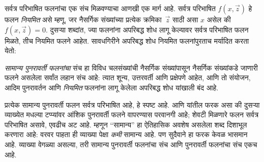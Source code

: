 \documentclass[../../../include/open-logic-section]{subfiles}
\begin{document}

सर्वत्र परिभाषित फलनांचा एक संच मिळवण्याचा आणखी एक मार्ग आहे.
सर्वत्र परिभाषित $f(x,\vec z)$ हे फलन \emph{नियमित} असे म्हणू, जर
नैसर्गिक संख्यांच्या प्रत्येक क्रमिका~$\vec z$ साठी असा $x$ असेल की
$f(x,\vec z) = 0$. दुसऱ्या शब्दांत, ज्या फलनांना अपरिबद्ध शोध लागू
केल्यावर सर्वत्र परिभाषित फलन मिळते, तीच नियमित फलने आहेत.
सावधगिरीने अपरिबद्ध शोध नियमित फलनांपुरताच मर्यादित करता येतो:

\begin{defn}
\emph{सामान्य पुनरावर्ती फलनांचा} संच हा विविध चलसंख्यांची नैसर्गिक
संख्यांपासून नैसर्गिक संख्यांकडे जाणारी फलने असलेला सर्वांत लहान संच
आहे: त्यात शून्य, उत्तरवर्ती आणि प्रक्षेपणे आहेत, आणि तो संयोजन, आदिम
पुनरावर्तन आणि \emph{नियमित} फलनांना लागू केलेला अपरिबद्ध शोध यांखाली
बंद आहे.
\end{defn}

प्रत्येक सामान्य पुनरावर्ती फलन सर्वत्र परिभाषित आहे, हे स्पष्ट आहे.
 आणि 
यांतील फरक असा की दुसऱ्या व्याख्येत मधल्या टप्प्यांवर आंशिक पुनरावर्ती
फलने वापरण्यास परवानगी आहे; शेवटी मिळणारे फलन सर्वत्र परिभाषित असावे,
एवढीच अट आहे. म्हणून ``सामान्य'' हा ऐतिहासिक अवशेष असलेला शब्द
दिशाभूल करणारा आहे: वरवर पाहता  ही
व्याख्या  पेक्षा \emph{कमी} सामान्य
आहे. पण सुदैवाने हा फरक केवळ भासमान आहे. व्याख्या वेगळ्या असल्या,
तरी सामान्य पुनरावर्ती फलनांचा संच आणि पुनरावर्ती फलनांचा संच एकच आहे.
\end{document}
